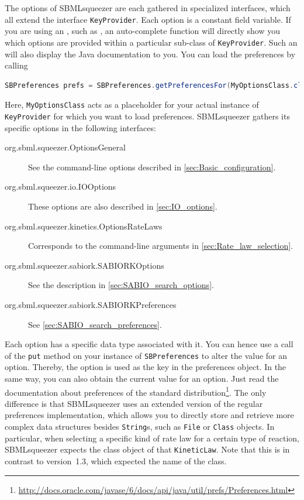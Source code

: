 The options of SBMLsqueezer are each gathered in specialized interfaces, which all extend the interface \texttt{KeyProvider}.
Each option is a constant field variable.
If you are using an \IDE, such as \Eclipse, an auto-complete function will directly show you which options are provided within a particular sub-class of \texttt{KeyProvider}.
Such an \IDE will also display the Java documentation to you.
You can load the preferences by calling
\begin{lstlisting}[language=Java, numbers=none, caption={Loading preferences in SBMLsqueezer}]
SBPreferences prefs = SBPreferences.getPreferencesFor(MyOptionsClass.class);
\end{lstlisting}
Here, \texttt{MyOptionsClass} acts as a placeholder for your actual instance of \texttt{KeyProvider} for which you want to load preferences.
SBMLsqueezer gathers its specific options in the following interfaces:
\renewcommand{\descriptionlabel}[1]{\textcolor{blue}{\texttt{#1}}}
\begin{description}
  \item[org.sbml.squeezer.OptionsGeneral] See the command-line options described in \vref{sec:Basic_configuration}.
  \item[org.sbml.squeezer.io.IOOptions] These options are also described in \vref{sec:IO_options}.
  \item[org.sbml.squeezer.kinetics.OptionsRateLaws] Corresponds to the command-line arguments in \vref{sec:Rate_law_selection}.
  \item[org.sbml.squeezer.sabiork.SABIORKOptions] See the description in \vref{sec:SABIO_search_options}.
  \item[org.sbml.squeezer.sabiork.SABIORKPreferences] See \vref{sec:SABIO_search_preferences}.
\end{description}
Each option has a specific data type associated with it.
You can hence use a call of the \texttt{put} method on your instance of \texttt{SBPreferences} to alter the value
for an option.
Thereby, the option is used as the key in the preferences object.
In the same way, you can also obtain the current value for an option.
Just read the documentation about preferences of the standard \Java distribution\footnote{\url{http://docs.oracle.com/javase/6/docs/api/java/util/prefs/Preferences.html}}.
The only difference is that SBMLsqueezer uses an extended version of the regular preferences implementation, which allows you to directly store and retrieve more complex data structures besides \texttt{String}s, such as \texttt{File} or \texttt{Class} objects.
In particular, when selecting a specific kind of rate law for a certain type of reaction, SBMLsqueezer expects the class object of that \texttt{KineticLaw}.
Note that this is in contrast to version~1.3, which expected the name of the class.

